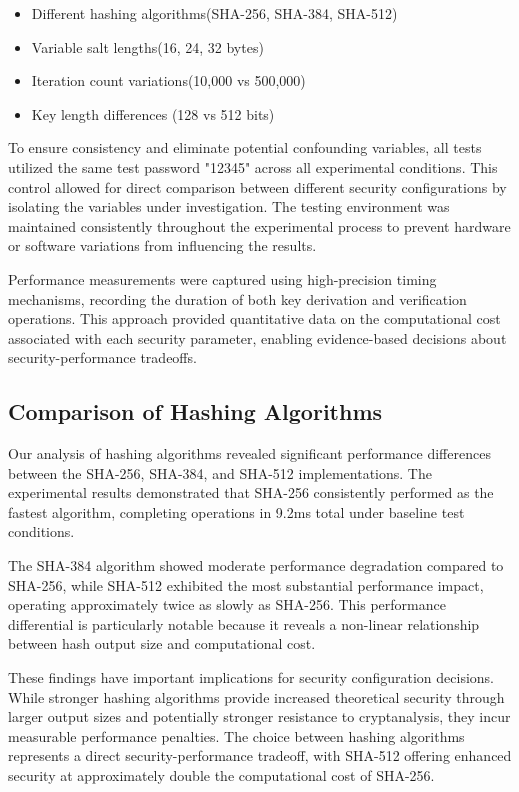 \documentclass[11pt,a4paper]{article}
\begin{document}
\begin{itemize}
  \item Different hashing algorithms(SHA-256, SHA-384, SHA-512)
  \item Variable salt lengths(16, 24, 32 bytes)
  \item Iteration count variations(10,000 vs 500,000)
  \item Key length differences (128 vs 512 bits)
\end{itemize}

To ensure consistency and eliminate potential confounding variables, all tests utilized the same test password "12345" across all experimental conditions. This control allowed for direct comparison between different security configurations by isolating the variables under investigation. The testing environment was maintained consistently throughout the experimental process to prevent hardware or software variations from influencing the results.

Performance measurements were captured using high-precision timing mechanisms, recording the duration of both key derivation and verification operations. This approach provided quantitative data on the computational cost associated with each security parameter, enabling evidence-based decisions about security-performance tradeoffs.

\subsection{Comparison of Hashing Algorithms}
Our analysis of hashing algorithms revealed significant performance differences between the SHA-256, SHA-384, and SHA-512 implementations. The experimental results demonstrated that SHA-256 consistently performed as the fastest algorithm, completing operations in 9.2ms total under baseline test conditions.

The SHA-384 algorithm showed moderate performance degradation compared to SHA-256, while SHA-512 exhibited the most substantial performance impact, operating approximately twice as slowly as SHA-256. This performance differential is particularly notable because it reveals a non-linear relationship between hash output size and computational cost.

These findings have important implications for security configuration decisions. While stronger hashing algorithms provide increased theoretical security through larger output sizes and potentially stronger resistance to cryptanalysis, they incur measurable performance penalties. The choice between hashing algorithms represents a direct security-performance tradeoff, with SHA-512 offering enhanced security at approximately double the computational cost of SHA-256.
\end{document}
